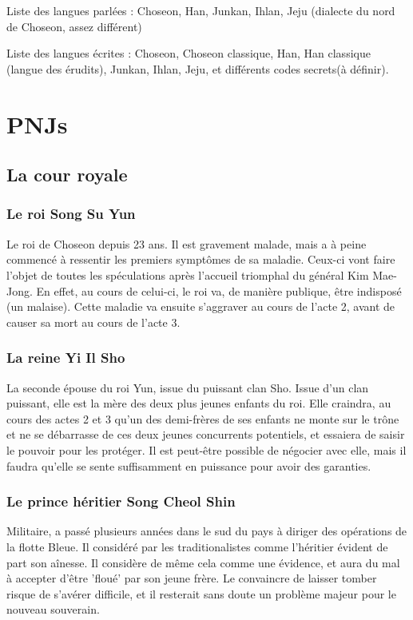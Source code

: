 \documentclass[10pt,a4paper]{book}
\begin{document}
Liste des langues parlées : Choseon, Han, Junkan, Ihlan, Jeju (dialecte du nord de Choseon, assez différent)

Liste des langues écrites : Choseon, Choseon classique, Han, Han classique (langue des érudits), Junkan, Ihlan, Jeju, et différents codes secrets(à définir).

\chapter{PNJs}
\section{La cour royale}
\subsection{Le roi Song Su Yun}
Le roi de Choseon depuis 23 ans. Il est gravement malade, mais a à peine commencé à ressentir les premiers symptômes de sa maladie. Ceux-ci vont faire l'objet de toutes les spéculations après l'accueil triomphal du général Kim Mae-Jong. En effet, au cours de celui-ci, le roi va, de manière publique, être indisposé (un malaise). Cette maladie va ensuite s'aggraver au cours de l'acte 2, avant de causer sa mort au cours de l'acte 3.
\subsection{La reine Yi Il Sho}
La seconde épouse du roi Yun, issue du puissant clan Sho. Issue d'un clan puissant, elle est la mère des deux plus jeunes enfants du roi. Elle craindra, au cours des actes 2 et 3 qu'un des demi-frères de ses enfants ne monte sur le trône et ne se débarrasse de ces deux jeunes concurrents potentiels, et essaiera de saisir le pouvoir pour les protéger. Il est peut-être possible de négocier avec elle, mais il faudra qu'elle se sente suffisamment en puissance pour avoir des garanties.
\subsection{Le prince héritier Song Cheol Shin}
Militaire, a passé plusieurs années dans le sud du pays à diriger des opérations de la flotte Bleue. Il considéré par les traditionalistes comme l'héritier évident de part son aînesse. Il considère de même cela comme une évidence, et aura du mal à accepter d'être 'floué' par son jeune frère. Le convaincre de laisser tomber risque de s'avérer difficile, et il resterait sans doute un problème majeur pour le nouveau souverain. 
\end{document}
